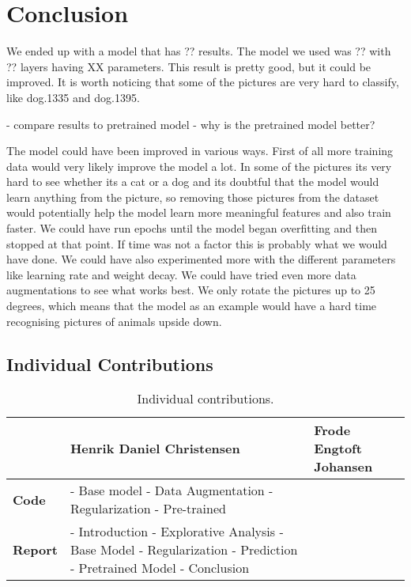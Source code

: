 \section{Conclusion}
We ended up with a model that has ?? results. The model we used was ?? with ?? layers having XX parameters. This result is pretty good, but it could be improved. It is worth noticing that some of the pictures are very hard to classify, like dog.1335 and dog.1395.

- compare results to pretrained model - why is the pretrained model better?


The model could have been improved in various ways.
First of all more training data would very likely improve the model a lot. In some of the pictures its very hard to see whether its a cat or a dog and its doubtful that the model would learn anything from the picture, so removing those pictures from the dataset would potentially help the model learn more meaningful features and also train faster.
We could have run epochs until the model began overfitting and then stopped at that point. If time was not a factor this is probably what we would have done.
We could have also experimented more with the different parameters like learning rate and weight decay. 
We could have tried even more data augmentations to see what works best. We only rotate the pictures up to 25 degrees, which means that the model as an example would have a hard time recognising pictures of animals upside down.


\subsection{Individual Contributions}
\begin{table}[H]
    \centering
    \begin{tabular}{|l|p{5cm}|p{5cm}|}
    \hline
                    & \textbf{Henrik Daniel Christensen} & \textbf{Frode Engtoft Johansen} \\ \hline
    \textbf{Code}   & - Base model \newline - Data Augmentation \newline - Regularization \newline - Pre-trained & \\ \hline
    \textbf{Report} & - Introduction \newline - Explorative Analysis \newline - Base Model \newline - Regularization \newline - Prediction \newline - Pretrained Model \newline - Conclusion & \\ \hline
    \end{tabular}
    \caption{Individual contributions.}
    \label{tab:individual_contributions}
\end{table}
